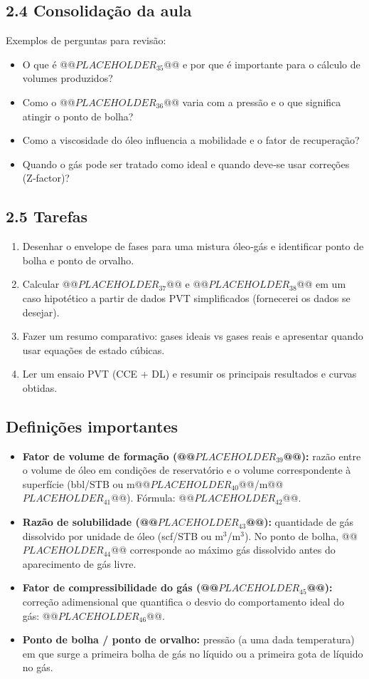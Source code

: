 \documentclass[11pt,a4paper]{article}
\begin{document}
\subsection{2.4 Consolidação da aula}
Exemplos de perguntas para revisão:
\begin{itemize}
\item O que é @@$PLACEHOLDER_{35}$@@ e por que é importante para o cálculo de volumes produzidos?
\item Como o @@$PLACEHOLDER_{36}$@@ varia com a pressão e o que significa atingir o ponto de bolha?
\item Como a viscosidade do óleo influencia a mobilidade e o fator de recuperação?
\item Quando o gás pode ser tratado como ideal e quando deve‑se usar correções (Z‑factor)?
\end{itemize}

\subsection{2.5 Tarefas}
\begin{enumerate}
\item Desenhar o envelope de fases para uma mistura óleo‑gás e identificar ponto de bolha e ponto de orvalho.
\item Calcular @@$PLACEHOLDER_{37}$@@ e @@$PLACEHOLDER_{38}$@@ em um caso hipotético a partir de dados PVT simplificados (fornecerei os dados se desejar).
\item Fazer um resumo comparativo: gases ideais vs gases reais e apresentar quando usar equações de estado cúbicas.
\item Ler um ensaio PVT (CCE + DL) e resumir os principais resultados e curvas obtidas.
\end{enumerate}

\subsection{Definições importantes}
\begin{itemize}
\item \textbf{Fator de volume de formação (@@$PLACEHOLDER_{39}$@@):} razão entre o volume de óleo em condições de reservatório e o volume correspondente à superfície (bbl/STB ou m@@$PLACEHOLDER_{40}$@@/m@@$PLACEHOLDER_{41}$@@). Fórmula: @@$PLACEHOLDER_{42}$@@.
\item \textbf{Razão de solubilidade (@@$PLACEHOLDER_{43}$@@):} quantidade de gás dissolvido por unidade de óleo (scf/STB ou m$^3$/m$^3$). No ponto de bolha, @@$PLACEHOLDER_{44}$@@ corresponde ao máximo gás dissolvido antes do aparecimento de gás livre.
\item \textbf{Fator de compressibilidade do gás (@@$PLACEHOLDER_{45}$@@):} correção adimensional que quantifica o desvio do comportamento ideal do gás: @@$PLACEHOLDER_{46}$@@.
\item \textbf{Ponto de bolha / ponto de orvalho:} pressão (a uma dada temperatura) em que surge a primeira bolha de gás no líquido ou a primeira gota de líquido no gás.
\end{itemize}
\end{document}
